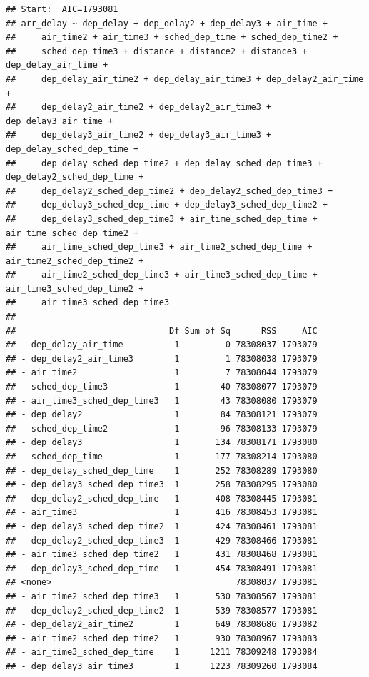 \documentclass[
]{article}
\begin{document}
\begin{verbatim}
## Start:  AIC=1793081
## arr_delay ~ dep_delay + dep_delay2 + dep_delay3 + air_time + 
##     air_time2 + air_time3 + sched_dep_time + sched_dep_time2 + 
##     sched_dep_time3 + distance + distance2 + distance3 + dep_delay_air_time + 
##     dep_delay_air_time2 + dep_delay_air_time3 + dep_delay2_air_time + 
##     dep_delay2_air_time2 + dep_delay2_air_time3 + dep_delay3_air_time + 
##     dep_delay3_air_time2 + dep_delay3_air_time3 + dep_delay_sched_dep_time + 
##     dep_delay_sched_dep_time2 + dep_delay_sched_dep_time3 + dep_delay2_sched_dep_time + 
##     dep_delay2_sched_dep_time2 + dep_delay2_sched_dep_time3 + 
##     dep_delay3_sched_dep_time + dep_delay3_sched_dep_time2 + 
##     dep_delay3_sched_dep_time3 + air_time_sched_dep_time + air_time_sched_dep_time2 + 
##     air_time_sched_dep_time3 + air_time2_sched_dep_time + air_time2_sched_dep_time2 + 
##     air_time2_sched_dep_time3 + air_time3_sched_dep_time + air_time3_sched_dep_time2 + 
##     air_time3_sched_dep_time3
## 
##                              Df Sum of Sq      RSS     AIC
## - dep_delay_air_time          1         0 78308037 1793079
## - dep_delay2_air_time3        1         1 78308038 1793079
## - air_time2                   1         7 78308044 1793079
## - sched_dep_time3             1        40 78308077 1793079
## - air_time3_sched_dep_time3   1        43 78308080 1793079
## - dep_delay2                  1        84 78308121 1793079
## - sched_dep_time2             1        96 78308133 1793079
## - dep_delay3                  1       134 78308171 1793080
## - sched_dep_time              1       177 78308214 1793080
## - dep_delay_sched_dep_time    1       252 78308289 1793080
## - dep_delay3_sched_dep_time3  1       258 78308295 1793080
## - dep_delay2_sched_dep_time   1       408 78308445 1793081
## - air_time3                   1       416 78308453 1793081
## - dep_delay3_sched_dep_time2  1       424 78308461 1793081
## - dep_delay2_sched_dep_time3  1       429 78308466 1793081
## - air_time3_sched_dep_time2   1       431 78308468 1793081
## - dep_delay3_sched_dep_time   1       454 78308491 1793081
## <none>                                    78308037 1793081
## - air_time2_sched_dep_time3   1       530 78308567 1793081
## - dep_delay2_sched_dep_time2  1       539 78308577 1793081
## - dep_delay2_air_time2        1       649 78308686 1793082
## - air_time2_sched_dep_time2   1       930 78308967 1793083
## - air_time3_sched_dep_time    1      1211 78309248 1793084
## - dep_delay3_air_time3        1      1223 78309260 1793084

\end{verbatim}
\end{document}
